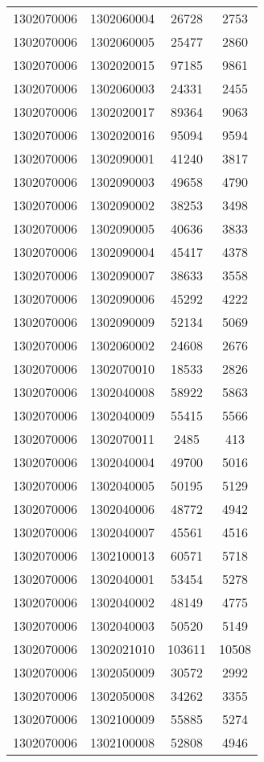 \begin{longtable}[h]{llcc}
		1302070006 & 1302060004 & 26728 & 2753\\
		1302070006 & 1302060005 & 25477 & 2860\\
		1302070006 & 1302020015 & 97185 & 9861\\
		1302070006 & 1302060003 & 24331 & 2455\\
		1302070006 & 1302020017 & 89364 & 9063\\
		1302070006 & 1302020016 & 95094 & 9594\\
		1302070006 & 1302090001 & 41240 & 3817\\
		1302070006 & 1302090003 & 49658 & 4790\\
		1302070006 & 1302090002 & 38253 & 3498\\
		1302070006 & 1302090005 & 40636 & 3833\\
		1302070006 & 1302090004 & 45417 & 4378\\
		1302070006 & 1302090007 & 38633 & 3558\\
		1302070006 & 1302090006 & 45292 & 4222\\
		1302070006 & 1302090009 & 52134 & 5069\\
		1302070006 & 1302060002 & 24608 & 2676\\
		1302070006 & 1302070010 & 18533 & 2826\\
		1302070006 & 1302040008 & 58922 & 5863\\
		1302070006 & 1302040009 & 55415 & 5566\\
		1302070006 & 1302070011 & 2485 & 413\\
		1302070006 & 1302040004 & 49700 & 5016\\
		1302070006 & 1302040005 & 50195 & 5129\\
		1302070006 & 1302040006 & 48772 & 4942\\
		1302070006 & 1302040007 & 45561 & 4516\\
		1302070006 & 1302100013 & 60571 & 5718\\
		1302070006 & 1302040001 & 53454 & 5278\\
		1302070006 & 1302040002 & 48149 & 4775\\
		1302070006 & 1302040003 & 50520 & 5149\\
		1302070006 & 1302021010 & 103611 & 10508\\
		1302070006 & 1302050009 & 30572 & 2992\\
		1302070006 & 1302050008 & 34262 & 3355\\
		1302070006 & 1302100009 & 55885 & 5274\\
		1302070006 & 1302100008 & 52808 & 4946\\

\end{longtable}
